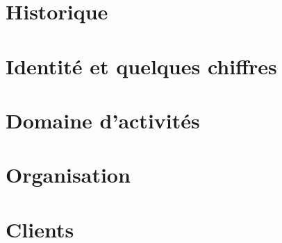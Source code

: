 \section{Historique}
	

\section{Identité et quelques chiffres}
	
	
\section{Domaine d'activités}
	
	
\section{Organisation}
	
		
\section{Clients}
	